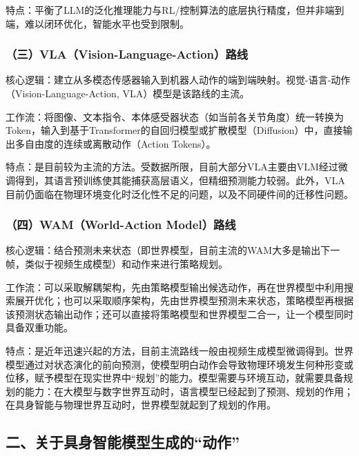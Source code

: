 特点：平衡了LLM的泛化推理能力与RL/控制算法的底层执行精度，但并非端到端，难以闭环优化，智能水平也受到限制。

\hypertarget{ux4e09vlavision-language-actionux8defux7ebf}{%
\subsubsection{（三）VLA（Vision-Language-Action）路线}\label{ux4e09vlavision-language-actionux8defux7ebf}}

核心逻辑：建立从多模态传感器输入到机器人动作的端到端映射。视觉-语言-动作（Vision-Language-Action, VLA）模型是该路线的主流。

工作流：将图像、文本指令、本体感受器状态（如当前各关节角度）统一转换为Token，输入到基于Transformer的自回归模型或扩散模型（Diffusion）中，直接输出多自由度的连续或离散动作（Action Tokens）。

特点：是目前较为主流的方法。受数据所限，目前大部分VLA主要由VLM经过微调得到，其语言预训练使其能捕获高层语义，但精细预测能力较弱。此外，VLA目前仍面临在物理环境变化时泛化性不足的问题，以及不同硬件间的迁移性问题。

\hypertarget{ux56dbwamworld-action-modelux8defux7ebf}{%
\subsubsection{（四）WAM（World-Action Model）路线}\label{ux56dbwamworld-action-modelux8defux7ebf}}

核心逻辑：结合预测未来状态（即世界模型，目前主流的WAM大多是输出下一帧，类似于视频生成模型）和动作来进行策略规划。

工作流：可以采取解耦架构，先由策略模型输出候选动作，再在世界模型中利用搜索展开优化；也可以采取顺序架构，先由世界模型预测未来状态，策略模型再根据该预测状态输出动作；还可以直接将策略模型和世界模型二合一，让一个模型同时具备双重功能。

特点：是近年迅速兴起的方法，目前主流路线一般由视频生成模型微调得到。世界模型通过对状态演化的前向预测，使模型明白动作会导致物理环境发生何种形变或位移，赋予模型在现实世界中``规划''的能力。模型需要与环境互动，就需要具备规划的能力：在大模型与数字世界互动时，语言模型已经起到了预测、规划的作用；在具身智能与物理世界互动时，世界模型就起到了规划的作用。

\hypertarget{ux4e8cux5173ux4e8eux5177ux8eabux667aux80fdux6a21ux578bux751fux6210ux7684ux52a8ux4f5c}{%
\subsection{二、关于具身智能模型生成的``动作''}\label{ux4e8cux5173ux4e8eux5177ux8eabux667aux80fdux6a21ux578bux751fux6210ux7684ux52a8ux4f5c}}

